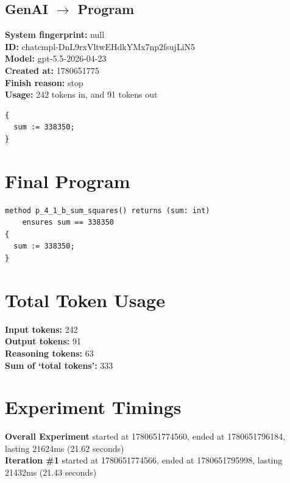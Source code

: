 \documentclass{article}
\begin{document}
\subsection*{GenAI $\rightarrow$ Program}
\textbf{System fingerprint: }null
\\\textbf{ID: }chatcmpl-DnL9rxVltwEHdkYMx7np2fsujLiN5
\\\textbf{Model: }gpt-5.5-2026-04-23
\\\textbf{Created at: }1780651775
\\\textbf{Finish reason: }stop
\\\textbf{Usage: }242 tokens in, and 91 tokens out
\begin{lstlisting}
{
  sum := 338350;
}
\end{lstlisting}
\section*{Final Program}
\begin{lstlisting}
method p_4_1_b_sum_squares() returns (sum: int)
	ensures sum == 338350
{
  sum := 338350;
}
\end{lstlisting}
\section*{Total Token Usage}
\textbf{Input tokens: }242
\\\textbf{Output tokens: }91
\\\textbf{Reasoning tokens: }63
\\\textbf{Sum of `total tokens': }333
\section*{Experiment Timings}
\textbf{Overall Experiment} started at 1780651774560, ended at 1780651796184, lasting 21624ms (21.62 seconds)
\\\textbf{Iteration \#1} started at 1780651774566, ended at 1780651795998, lasting 21432ms (21.43 seconds)
\end{document}
